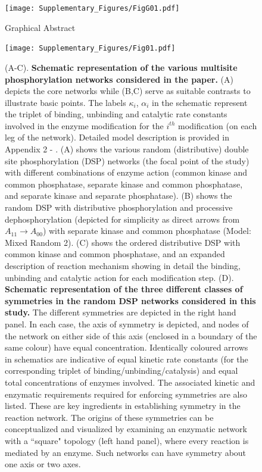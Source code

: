 \documentclass[16pt, a4paper]{article}
\newcommand{\beginmain}{%
    \setcounter{figure}{0}
    \renewcommand{\thefigure}{\arabic{figure}}%
     }
\newcommand{\begingraphical}{%
    \setcounter{figure}{0}
    \renewcommand{\thefigure}{G\arabic{figure}}%
     }
\begin{document}

\begingraphical 
\begin{figure}[ht!]
    \centering
    \texttt{[image: Supplementary\_Figures/FigG01.pdf]}
    \caption{Graphical Abstract}
    \label{Fig G1}
\end{figure}

\clearpage

\beginmain
\begin{figure}[ht!]
        \centering
        \texttt{[image: Supplementary\_Figures/Fig01.pdf]}
        \caption{(A-C). \textbf{Schematic representation of the various multisite phosphorylation networks considered in the paper.} (A) depicts the core networks while (B,C) serve as suitable contrasts to illustrate basic points. The labels $\kappa_i$, $\alpha_i$ in the schematic represent the triplet of binding, unbinding and catalytic rate constants involved in the enzyme modification for the $i^{th}$ modification (on each leg of the network). Detailed model description is provided in Appendix 2 - . (A) shows the various random (distributive) double site phosphorylation (DSP) networks (the focal point of the study) with different combinations of enzyme action (common kinase and common phosphatase, separate kinase and common phosphatase, and separate kinase and separate phosphatase). (B) shows the random DSP with distributive phosphorylation and processive dephosphorylation (depicted for simplicity as direct arrows from $A_{11} \rightarrow A_{00}$) with separate kinase and common phosphatase (Model: Mixed Random 2). (C) shows the ordered distributive DSP with common kinase and common phosphatase, and an expanded description of reaction mechanism showing in detail the binding, unbinding and catalytic action for each modification step. (D). \textbf{Schematic representation of the three different classes of symmetries in the random DSP networks considered in this study.} 
        The different symmetries are depicted in the right hand panel. In each case, the axis of symmetry is depicted, and nodes of the network on either side of this axis (enclosed in a boundary of the same colour) have equal concentration. Identically coloured arrows in schematics are indicative of equal kinetic rate constants (for the corresponding triplet of binding/unbinding/catalysis) and equal total concentrations of enzymes involved. The associated kinetic and enzymatic requirements required for enforcing symmetries are also listed. These are key ingredients in establishing symmetry in the reaction network. 
        The origins of these symmetries can be conceptualized and visualized by examining an enzymatic network with a ``square" topology (left hand panel), where every reaction is mediated by an enzyme. Such networks can have symmetry about one axis or two axes.
}
\end{figure}
\end{document}
